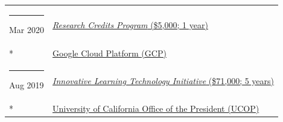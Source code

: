 \documentclass[margin,line]{res}
\begin{document}
\begin{resume}
\begin{longtable}{@{}p{0.7in}p{4in}}
\hspace*{-4mm} \rule{-1mm}{5mm} Mar 2020 & \href{https://edu.google.com/programs/credits/research/}{\textit{Research Credits Program} (\$5,000; 1 year)}\\*
\hspace*{-4mm} \hspace*{-4mm} & \hspace{4mm} \href{https://cloud.google.com/}{Google Cloud Platform (GCP)}\\
\hspace*{-4mm} \rule{-1mm}{5mm} Aug 2019 & \href{https://www.ucop.edu/innovative-learning-technology-initiative/}{\textit{Innovative Learning Technology Initiative} (\$71,000; 5 years)}\\*
\hspace*{-4mm} \hspace*{-4mm} & \hspace{4mm} \href{https://www.ucop.edu/}{University of California Office of the President (UCOP)}\\
\end{longtable}


\end{resume}
\end{document}
